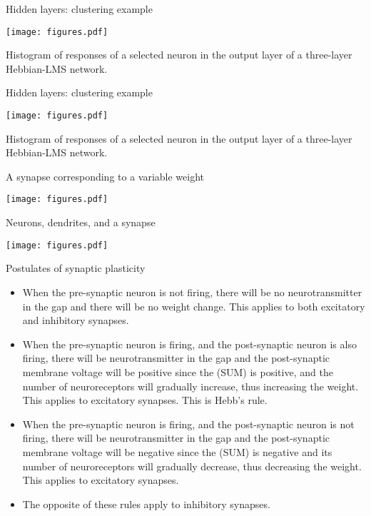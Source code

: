 \documentclass[10pt]{beamer}
\begin{document}
\begin{frame}{Hidden layers: clustering example}
\begin{center}
\texttt{[image: figures.pdf]}
\end{center}
\large Histogram of responses of a selected neuron in the output layer of a
three-layer Hebbian-LMS network.
\end{frame}

\begin{frame}{Hidden layers: clustering example}
\begin{center}
\texttt{[image: figures.pdf]}
\end{center}
\large Histogram of responses of a selected neuron in the output layer of a three-layer Hebbian-LMS network.
\end{frame}

\begin{frame}{A synapse corresponding to a variable weight}
\begin{center}
	\texttt{[image: figures.pdf]}
\end{center}
\end{frame}

\begin{frame}{Neurons, dendrites, and a synapse}
\begin{center}
	\texttt{[image: figures.pdf]}
\end{center}
\end{frame}

\begin{frame}{Postulates of synaptic plasticity}
\begin{itemize}
	\setlength\itemsep{1em}
	\item When the pre-synaptic neuron is not firing, there will be no neurotransmitter in the gap and there will be no weight change. This applies to both excitatory and inhibitory synapses.
	\item When the pre-synaptic neuron is firing, and the post-synaptic neuron is also firing, there will be neurotransmitter in the gap and the post-synaptic membrane voltage will be positive since the (SUM) is positive, and the number of neuroreceptors will gradually increase, thus increasing the weight. This applies to excitatory synapses. This is Hebb's rule.
	\item When the pre-synaptic neuron is firing, and the post-synaptic neuron is not firing, there will be neurotransmitter in the gap and the post-synaptic membrane voltage will be negative since the (SUM) is negative and its number of neuroreceptors will gradually decrease, thus decreasing the weight. This applies to excitatory synapses.
	\item The opposite of these rules apply to inhibitory synapses.
\end{itemize}
\end{frame}
\end{document}
